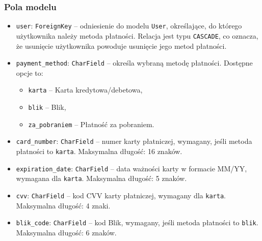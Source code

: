 \documentclass[12pt,a4paper,oneside]{article}
\theoremstyle{definition}
\numberwithin{equation}{section}
\begin{document}
\subsubsection{Pola modelu}
\begin{itemize}
    \item \texttt{user}: \texttt{ForeignKey} – odniesienie do modelu \texttt{User}, określające, do którego użytkownika należy metoda płatności. Relacja jest typu \texttt{CASCADE}, co oznacza, że usunięcie użytkownika powoduje usunięcie jego metod płatności.
    \item \texttt{payment\_method}: \texttt{CharField} – określa wybraną metodę płatności. Dostępne opcje to:
    \begin{itemize}
        \item \texttt{karta} – Karta kredytowa/debetowa,
        \item \texttt{blik} – Blik,
        \item \texttt{za\_pobraniem} – Płatność za pobraniem.
    \end{itemize}
    \item \texttt{card\_number}: \texttt{CharField} – numer karty płatniczej, wymagany, jeśli metoda płatności to \texttt{karta}. Maksymalna długość: 16 znaków.
    \item \texttt{expiration\_date}: \texttt{CharField} – data ważności karty w formacie MM/YY, wymagana dla \texttt{karta}. Maksymalna długość: 5 znaków.
    \item \texttt{cvv}: \texttt{CharField} – kod CVV karty płatniczej, wymagany dla \texttt{karta}. Maksymalna długość: 4 znaki.
    \item \texttt{blik\_code}: \texttt{CharField} – kod Blik, wymagany, jeśli metoda płatności to \texttt{blik}. Maksymalna długość: 6 znaków.
\end{itemize}
\end{document}
